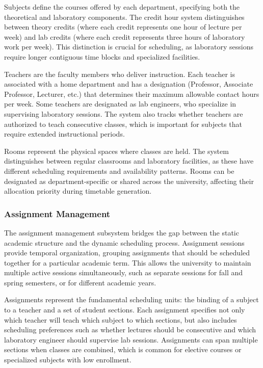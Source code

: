 \documentclass[12pt,a4paper]{article}
\begin{document}
Subjects define the courses offered by each department, specifying both the theoretical and laboratory components. The credit hour system distinguishes between theory credits (where each credit represents one hour of lecture per week) and lab credits (where each credit represents three hours of laboratory work per week). This distinction is crucial for scheduling, as laboratory sessions require longer contiguous time blocks and specialized facilities.

Teachers are the faculty members who deliver instruction. Each teacher is associated with a home department and has a designation (Professor, Associate Professor, Lecturer, etc.) that determines their maximum allowable contact hours per week. Some teachers are designated as lab engineers, who specialize in supervising laboratory sessions. The system also tracks whether teachers are authorized to teach consecutive classes, which is important for subjects that require extended instructional periods.

Rooms represent the physical spaces where classes are held. The system distinguishes between regular classrooms and laboratory facilities, as these have different scheduling requirements and availability patterns. Rooms can be designated as department-specific or shared across the university, affecting their allocation priority during timetable generation.

\subsubsection{Assignment Management}

The assignment management subsystem bridges the gap between the static academic structure and the dynamic scheduling process. Assignment sessions provide temporal organization, grouping assignments that should be scheduled together for a particular academic term. This allows the university to maintain multiple active sessions simultaneously, such as separate sessions for fall and spring semesters, or for different academic years.

Assignments represent the fundamental scheduling units: the binding of a subject to a teacher and a set of student sections. Each assignment specifies not only which teacher will teach which subject to which sections, but also includes scheduling preferences such as whether lectures should be consecutive and which laboratory engineer should supervise lab sessions. Assignments can span multiple sections when classes are combined, which is common for elective courses or specialized subjects with low enrollment.
\end{document}
